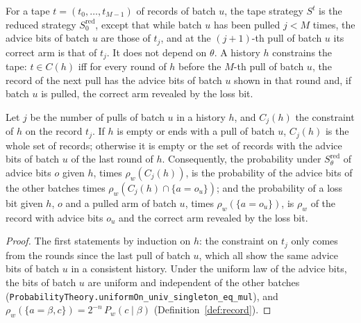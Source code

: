 \begin{definition}
  \label{def:tape_strategy}
  \leanok
  For a tape $t = (t_0, \dots, t_{M-1})$ of records of batch $u$, the tape strategy $S^t$ is the
  reduced strategy $S^{\mathrm{red}}_0$, except that while batch $u$ has been pulled $j < M$ times,
  the advice bits of batch $u$ are those of $t_j$, and at the $(j+1)$-th pull of batch $u$ its
  correct arm is that of $t_j$. It does not depend on $\theta$. A history $h$ constrains the tape:
  $t \in C(h)$ iff for every round of $h$ before the $M$-th pull of batch $u$, the record of the
  next pull has the advice bits of batch $u$ shown in that round and, if batch $u$ is pulled, the
  correct arm revealed by the loss bit.
\end{definition}

\begin{lemma}
  \label{lem:record_steps}
  \leanok
  Let $j$ be the number of pulls of batch $u$ in a history $h$, and $C_j(h)$ the constraint of $h$
  on the record $t_j$. If $h$ is empty or ends with a pull of batch $u$, $C_j(h)$ is the whole set
  of records; otherwise it is empty or the set of records with the advice bits of batch $u$ of the
  last round of $h$. Consequently, the probability under $S^{\mathrm{red}}_\theta$ of advice bits
  $o$ given $h$, times $\rho_w(C_j(h))$, is the probability of the advice bits of the other batches
  times $\rho_w(C_j(h) \cap \{a = o_u\})$; and the probability of a loss bit given $h$, $o$ and a
  pulled arm of batch $u$, times $\rho_w(\{a = o_u\})$, is $\rho_w$ of the record with advice bits
  $o_u$ and the correct arm revealed by the loss bit.
\end{lemma}

\begin{proof}
  \leanok
  The first statements by induction on $h$: the constraint on $t_j$ only comes from the rounds since
  the last pull of batch $u$, which all show the same advice bits of batch $u$ in a consistent
  history. Under the uniform law of the advice bits, the bits of batch $u$ are uniform and
  independent of the other batches (\texttt{ProbabilityTheory.uniformOn\_univ\_singleton\_eq\_mul}),
  and $\rho_w(\{a = \beta, c\}) = 2^{-n}\, P_w(c \mid \beta)$
  (Definition~\ref{def:record}).
\end{proof}

